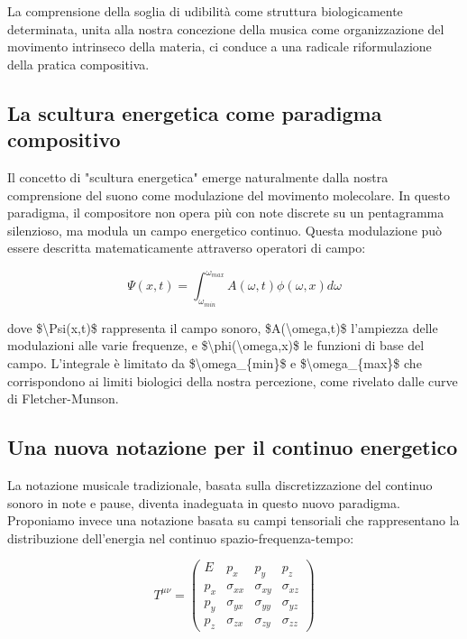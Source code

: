 \documentclass[a4paper,11pt]{article}
\begin{document}
La comprensione della soglia di udibilità come struttura biologicamente
determinata, unita alla nostra concezione della musica come
organizzazione del movimento intrinseco della materia, ci conduce a una
radicale riformulazione della pratica compositiva.

\subsection{La scultura energetica come paradigma compositivo}\hypertarget{la-scultura-energetica-come-paradigma-compositivo}{}\label{la-scultura-energetica-come-paradigma-compositivo}

Il concetto di "scultura energetica" emerge naturalmente dalla nostra
comprensione del suono come modulazione del movimento molecolare. In
questo paradigma, il compositore non opera più con note discrete su un
pentagramma silenzioso, ma modula un campo energetico continuo. Questa
modulazione può essere descritta matematicamente attraverso operatori di
campo:

\begin{displaymath}
\Psi(x,t) = \int_{\omega_{min}}^{\omega_{max}} A(\omega,t)\phi(\omega,x)d\omega
\end{displaymath}

dove \$\textbackslash{}Psi(x,t)\$ rappresenta il campo sonoro, \$A(\textbackslash{}omega,t)\$ l'ampiezza
delle modulazioni alle varie frequenze, e \$\textbackslash{}phi(\textbackslash{}omega,x)\$ le funzioni
di base del campo. L'integrale è limitato da \$\textbackslash{}omega\_\{min\}\$ e
\$\textbackslash{}omega\_\{max\}\$ che corrispondono ai limiti biologici della nostra
percezione, come rivelato dalle curve di Fletcher-Munson.

\subsection{Una nuova notazione per il continuo energetico}\hypertarget{una-nuova-notazione-per-il-continuo-energetico}{}\label{una-nuova-notazione-per-il-continuo-energetico}

La notazione musicale tradizionale, basata sulla discretizzazione del
continuo sonoro in note e pause, diventa inadeguata in questo nuovo
paradigma. Proponiamo invece una notazione basata su campi tensoriali
che rappresentano la distribuzione dell'energia nel continuo
spazio-frequenza-tempo:

\begin{displaymath}
T^{\mu\nu} = \begin{pmatrix}
E & p_x & p_y & p_z \\
p_x & \sigma_{xx} & \sigma_{xy} & \sigma_{xz} \\
p_y & \sigma_{yx} & \sigma_{yy} & \sigma_{yz} \\
p_z & \sigma_{zx} & \sigma_{zy} & \sigma_{zz}
\end{pmatrix}
\end{displaymath}
\end{document}
